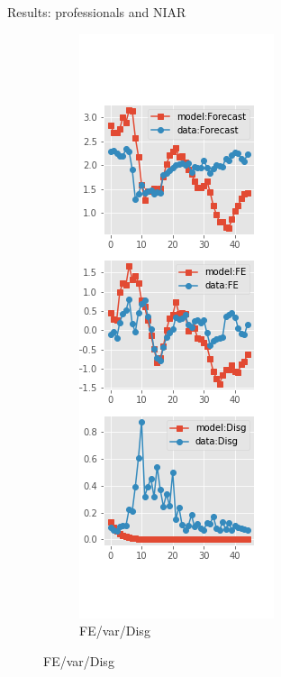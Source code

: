 \documentclass{beamer}
\begin{document}
\begin{frame}{Results: professionals and NIAR}
\begin{figure}[ht]
\begin{subfigure}[b]{0.19\textwidth}
		\end{subfigure}
		\hfill
		\begin{subfigure}[b]{0.19\textwidth}
			\caption{FE/var/Disg}
			\includegraphics[width=\textwidth, height = 0.8\textheight]{figuresDraft/spf_ni_est_diag4.png}
		\end{subfigure}
	\end{figure}
\end{frame}
\end{document}
